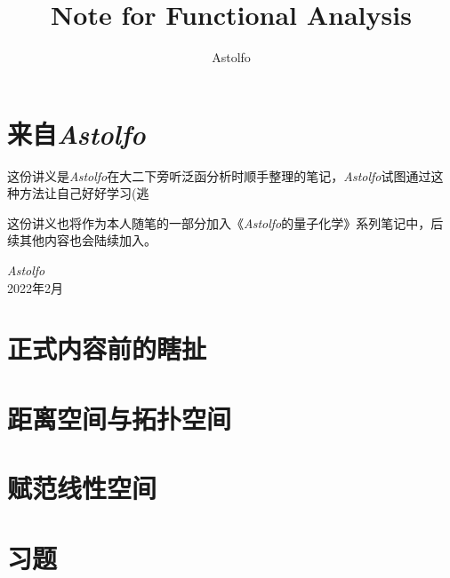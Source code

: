 \documentclass[lang=cn,10pt]{elegantbook}
\title{Note for Functional Analysis}
\author{Astolfo}
\begin{document}
\maketitle
\frontmatter


\mainmatter

\chapter*{来自\textit{Astolfo}}
\setcounter{page}{1}
这份讲义是\textit{Astolfo}在大二下旁听泛函分析时顺手整理的笔记，\textit{Astolfo}试图通过这种方法让自己好好学习(逃

这份讲义也将作为本人随笔的一部分加入《\textit{Astolfo}的量子化学》系列笔记中，后续其他内容也会陆续加入。
\begin{flushright}
    \textit{Astolfo} \\ 2022年2月
\end{flushright}
\tableofcontents
\thispagestyle{empty}
\newpage
\setcounter{page}{1}
\chapter{正式内容前的瞎扯}

\chapter{距离空间与拓扑空间}

\chapter{赋范线性空间}

\chapter{习题}

\end{document}
